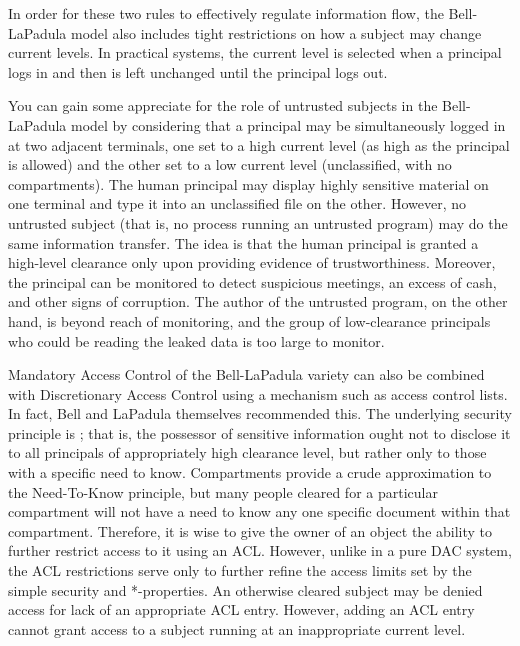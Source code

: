 In order for these two rules to effectively regulate information flow,
the Bell-LaPadula model also includes tight restrictions on how a
subject may change current levels.  In practical systems, the current
level is selected when a principal logs in and then is left unchanged
until the principal logs out.

You can gain some appreciate for the role of untrusted subjects in the
Bell-LaPadula model by considering that a principal may be
simultaneously logged in at two adjacent terminals, one set to a high
current level (as high as the principal is allowed) and the other set
to a low current level (unclassified, with no compartments).  The
human principal may display highly sensitive material on one terminal
and type it into an unclassified file on the other.  However, no
untrusted subject (that is, no process running an untrusted program)
may do the same information transfer.  The idea is that the human
principal is granted a high-level clearance only upon providing evidence
of trustworthiness.  Moreover, the principal can be monitored to
detect suspicious meetings, an excess of cash, and other signs of
corruption.  The author of the untrusted program, on the other hand,
is beyond reach of monitoring, and the group of low-clearance
principals who could be reading the leaked data is too large to
monitor.

Mandatory Access Control of the Bell-LaPadula variety can also be
combined with Discretionary Access Control using a mechanism such as
access control lists.  In fact, Bell and LaPadula themselves
recommended this.  The underlying security principle is ; that is, the possessor of sensitive information ought not to
disclose it to all principals of appropriately high clearance level,
but rather only to those with a specific need to know.  Compartments
provide a crude approximation to the Need-To-Know principle, but many
people cleared for a particular compartment will not have a
need to know any one specific document within that compartment.
Therefore, it is wise to give the owner of an object the ability to
further restrict access to it using an ACL.  However, unlike in a pure
DAC system, the ACL restrictions serve only to further refine the
access limits set by the simple security and *-properties.  An
otherwise cleared subject may be denied access for lack of an
appropriate ACL entry.  However, adding an ACL entry cannot grant
access to a subject running at an inappropriate current level.

